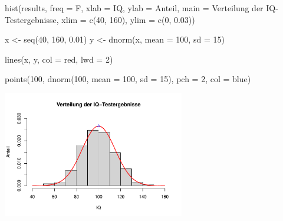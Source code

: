 \documentclass[12pt,a4paper]{article}
\newenvironment{Shaded}{\begin{snugshade}}{\end{snugshade}}
\newcommand{\AttributeTok}[1]{\textcolor[rgb]{0.77,0.63,0.00}{#1}}
\newcommand{\DecValTok}[1]{\textcolor[rgb]{0.00,0.00,0.81}{#1}}
\newcommand{\FloatTok}[1]{\textcolor[rgb]{0.00,0.00,0.81}{#1}}
\newcommand{\FunctionTok}[1]{\textcolor[rgb]{0.00,0.00,0.00}{#1}}
\newcommand{\NormalTok}[1]{#1}
\newcommand{\OtherTok}[1]{\textcolor[rgb]{0.56,0.35,0.01}{#1}}
\newcommand{\StringTok}[1]{\textcolor[rgb]{0.31,0.60,0.02}{#1}}
\begin{document}
\begin{Shaded}
\begin{Highlighting}[]
    \FunctionTok{hist}\NormalTok{(results, }
         \AttributeTok{freq =}\NormalTok{ F, }
         \AttributeTok{xlab =} \StringTok{\textquotesingle{}IQ\textquotesingle{}}\NormalTok{, }
         \AttributeTok{ylab =} \StringTok{\textquotesingle{}Anteil\textquotesingle{}}\NormalTok{, }
         \AttributeTok{main =} \StringTok{\textquotesingle{}Verteilung der IQ{-}Testergebnisse\textquotesingle{}}\NormalTok{, }
         \AttributeTok{xlim =} \FunctionTok{c}\NormalTok{(}\DecValTok{40}\NormalTok{, }\DecValTok{160}\NormalTok{), }
         \AttributeTok{ylim =} \FunctionTok{c}\NormalTok{(}\DecValTok{0}\NormalTok{, }\FloatTok{0.03}\NormalTok{))}
    
\NormalTok{    x }\OtherTok{\textless{}{-}} \FunctionTok{seq}\NormalTok{(}\DecValTok{40}\NormalTok{, }\DecValTok{160}\NormalTok{, }\FloatTok{0.01}\NormalTok{)}
\NormalTok{    y }\OtherTok{\textless{}{-}} \FunctionTok{dnorm}\NormalTok{(x, }\AttributeTok{mean =} \DecValTok{100}\NormalTok{, }\AttributeTok{sd =} \DecValTok{15}\NormalTok{)}
    
    \FunctionTok{lines}\NormalTok{(x, }
\NormalTok{          y, }
          \AttributeTok{col =} \StringTok{\textquotesingle{}red\textquotesingle{}}\NormalTok{, }
          \AttributeTok{lwd =} \DecValTok{2}\NormalTok{)}
    
    \FunctionTok{points}\NormalTok{(}\DecValTok{100}\NormalTok{, }
           \FunctionTok{dnorm}\NormalTok{(}\DecValTok{100}\NormalTok{, }\AttributeTok{mean =} \DecValTok{100}\NormalTok{, }\AttributeTok{sd =} \DecValTok{15}\NormalTok{), }
           \AttributeTok{pch =} \DecValTok{2}\NormalTok{, }
           \AttributeTok{col =} \StringTok{\textquotesingle{}blue\textquotesingle{}}\NormalTok{)}
\end{Highlighting}
\end{Shaded}

\begin{center}\includegraphics[width=300px]{solution_3_files/figure-latex/unnamed-chunk-14-1} \end{center}
\end{document}
